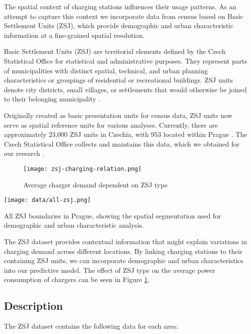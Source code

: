 The spatial context of charging stations influences their usage patterns. As an attempt to capture this context we incorporate data from census based on Basic Settlement Units (ZSJ), which provide demographic and urban characteristic information at a fine-grained spatial resolution.

Basic Settlement Units (ZSJ) are territorial elements defined by the Czech Statistical Office for statistical and administrative purposes. They represent parts of municipalities with distinct spatial, technical, and urban planning characteristics or groupings of residential or recreational buildings. ZSJ units denote city districts, small villages, or settlements that would otherwise be joined to their belonging municipality .

Originally created as basic presentation units for census data, ZSJ units now serve as spatial reference units for various analyses. Currently, there are approximately 23,000 ZSJ units in Czechia, with 953 located within Prague . The Czech Statistical Office collects and maintains this data, which we obtained for our research .

\begin{figure}
    \texttt{[image: zsj-charging-relation.png]}
    \caption{Average charger demand dependent on ZSJ type}
    \label{fig:zsj-charging-impact}
\end{figure}

\begin{marginfigure}
    \texttt{[image: data/all-zsj.png]}
    \caption{All \acrlong{ZSJ} boundaries in Prague, showing the spatial segmentation used for demographic and urban characteristic analysis.}
\end{marginfigure}


The ZSJ dataset provides contextual information that might explain variations in charging demand across different locations. By linking charging stations to their containing ZSJ units, we can incorporate demographic and urban characteristics into our predictive model. The effect of ZSJ type on the average power consumption of chargers can be seen in Figure \ref{fig:zsj-charging-impact}.

\subsection{Description}

The ZSJ dataset contains the following data for each area:

